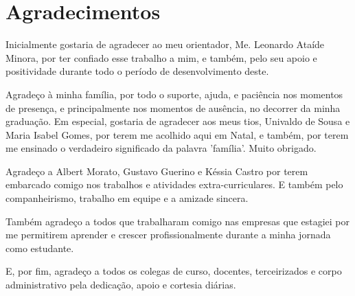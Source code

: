 
\chapter*{Agradecimentos}

Inicialmente gostaria de agradecer ao meu orientador, Me. Leonardo Ataíde Minora, por ter confiado esse trabalho a mim, e também, pelo seu apoio e positividade durante todo o período de desenvolvimento deste.

Agradeço à minha família, por todo o suporte, ajuda, e paciência nos momentos de presença, e principalmente nos momentos de ausência, no decorrer da minha graduação. Em especial, gostaria de agradecer aos meus tios, Univaldo de Sousa e Maria Isabel Gomes, por terem me acolhido aqui em Natal, e também, por terem me ensinado o verdadeiro significado da palavra 'família'. Muito obrigado.

Agradeço a Albert Morato, Gustavo Guerino e Késsia Castro por terem embarcado comigo nos trabalhos e atividades extra-curriculares. E também pelo companheirismo, trabalho em equipe e a amizade sincera.

Também agradeço a todos que trabalharam comigo nas empresas que estagiei por me permitirem aprender e crescer profissionalmente durante a minha jornada como estudante.

E, por fim, agradeço a todos os colegas de curso, docentes, terceirizados e corpo administrativo pela dedicação, apoio e cortesia diárias.